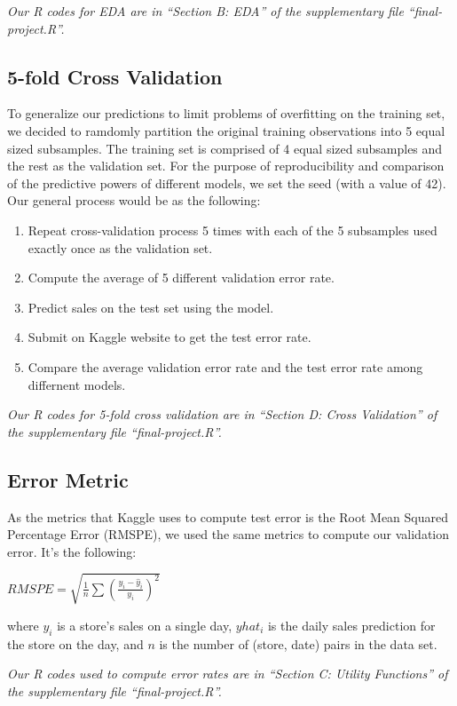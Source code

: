 \documentclass[letterpaper,twocolumn,11pt]{article}
\begin{document}

\textit{Our R codes for EDA are in ``Section B: EDA'' of the supplementary file ``final-project.R''.}

\subsection{5-fold Cross Validation}
To generalize our predictions to limit problems of overfitting on the training set, we decided to ramdomly partition the original training observations into 5 equal sized subsamples. The training set is comprised of 4 equal sized subsamples and the rest as the validation set. For the purpose of reproducibility and comparison of the predictive powers of different models, we set the seed (with a value of 42). Our general process would be as the following:
\begin{enumerate}
\item  Repeat cross-validation process 5 times with each of the 5 subsamples used exactly once as the validation set.
\item Compute the average of 5 different validation error rate. 
\item Predict sales on the test set using the model. 
\item Submit on Kaggle website to get the test error rate.
\item Compare the average validation error rate and the test error rate among differnent models.
\end{enumerate}
  
\textit{Our R codes for 5-fold cross validation are in ``Section D: Cross Validation'' of the supplementary file ``final-project.R''.}

\subsection{Error Metric}
As the metrics that Kaggle uses to compute test error is the Root Mean Squared Percentage Error (RMSPE), we used the same metrics to compute our validation error. It's the following:

$RMSPE = \sqrt{\frac{1}{n} \sum {(\frac{y_i - \hat y_i}{y_i})}^2}$

where ${y_i}$ is a store's sales on a single day, ${yhat_i}$ is the daily sales prediction for the store on the day, and ${n}$ is the number of (store, date) pairs in the data set.

\textit{Our R codes used to compute error rates are in ``Section C: Utility Functions'' of the supplementary file ``final-project.R''.}
\end{document}
